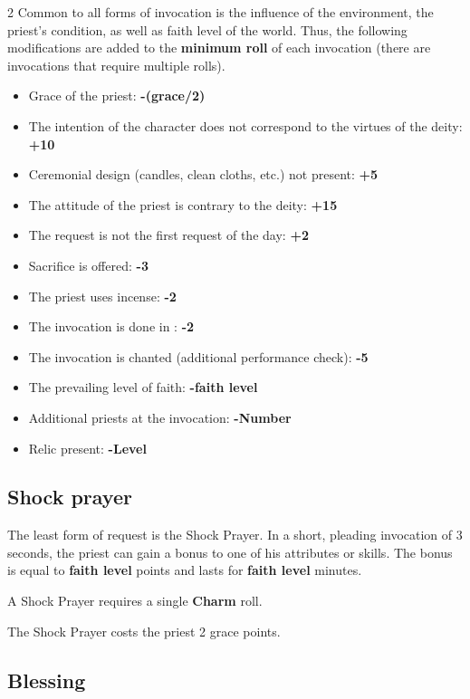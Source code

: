 \begin{multicols}{2}
Common to all forms of invocation is the influence of the environment, the priest's condition, as well as faith level of the world. Thus, the following modifications are added to the \textbf{minimum roll} of each invocation (there are invocations that require multiple rolls).
\begin{itemize}
    \item Grace of the priest: \textbf{-(grace/2)}
    \item The intention of the character does not correspond to the virtues of the deity: \textbf{+10}
    \item Ceremonial design (candles, clean cloths, etc.) not present: \textbf{+5}
    \item The attitude of the priest is contrary to the deity: \textbf{+15}
    \item The request is not the first request of the day: \textbf{+2}
    \item Sacrifice is offered: \textbf{-3}
    \item The priest uses incense: \textbf{-2}
    \item The invocation is done in : \textbf{-2}
    \item The invocation is chanted (additional performance check): \textbf{-5}
    \item The prevailing level of faith: \textbf{-faith level}
    \item Additional priests at the invocation: \textbf{-Number}
    \item Relic present: \textbf{-Level}
\end{itemize}

\subsection{Shock prayer}

The least form of request is the Shock Prayer. In a short, pleading invocation of 3 seconds, the priest can gain a bonus to one of his attributes or skills. The bonus is equal to \textbf{faith level} points and lasts for \textbf{faith level} minutes.

A Shock Prayer requires a single \textbf{Charm} roll.

The Shock Prayer costs the priest 2 grace points.

\subsection{Blessing}


\end{multicols}
